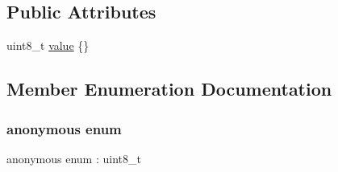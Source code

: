 \subsection*{Public Attributes}
\begin{DoxyCompactItemize}
\item 
uint8\+\_\+t \hyperlink{structmaf__perception__interface_1_1FeaturePointArrayPropertyEnum_a6414ac7414c36ba4d1df21f92e98a823}{value} \{\}
\end{DoxyCompactItemize}


\subsection{Member Enumeration Documentation}
\mbox{\label{structmaf__perception__interface_1_1FeaturePointArrayPropertyEnum_a05664e145337aebf4276beddbe170f11}} 
\subsubsection{\texorpdfstring{anonymous enum}{anonymous enum}}
{\footnotesize\ttfamily anonymous enum \+: uint8\+\_\+t}

